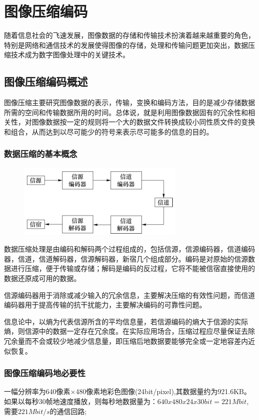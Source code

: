 \documentclass[11pt]{article}
\begin{document}
\section{图像压缩编码}
随着信息社会的飞速发展，图像数据的存储和传输技术扮演着越来越重要的角色，特别是网络和通信技术的发展使得图像的存储，处理和传输问题更加突出，数据压缩技术成为数字图像处理中的关键技术。
\subsection{图像压缩编码概述}
图像压缩主要研究图像数据的表示，传输，变换和编码方法，目的是减少存储数据所需的空间和传输数据所用的时间。总体说，就是利用图像数据固有的冗余性和相关性，对图像数据按一定的规则将一个大的数据文件转换成较小同性质文件的变换和组合，从而达到以尽可能少的符号来表示尽可能多的信息的目的。
\subsubsection{数据压缩的基本概念}
\begin{figure}[H]
	\centering
	\includegraphics[scale=0.5]{36}
\end{figure}
数据压缩处理是由编码和解码两个过程组成的，包括信源，信源编码器，信道编码器，信道，信道解码器，信源解码器，新宿几个组成部分。编码是对原始的信源数据进行压缩，便于传输或存储；解码是编码的反过程，它将不能被信宿直接使用的数据还原成可用的数据。

信源编码器用于消除或减少输入的冗余信息，主要解决压缩的有效性问题，而信道编码器用于提高传输的抗干扰能力，主要解决编码的可靠性问题。

信息论中，以熵为代表信源所含的平均信息量，若信源编码的熵大于信源的实际熵，则信源中的数据一定存在冗余度。在实际应用场合，压缩过程应尽量保证去除冗余量而不会或较少地减少信息量，即压缩后地数据要能够完全或一定地容差内近似恢复。

\subsubsection{图像压缩编码地必要性}
一幅分辨率为640像素$\times$480像素地彩色图像(24bit/pixel),其数据量约为921.6KB。如果以每秒30帧地速度播放，则每秒地数据量为：$640x480x24x30 bit = 221Mbit$,需要$221Mbit/s$的通信回路;
\end{document}
